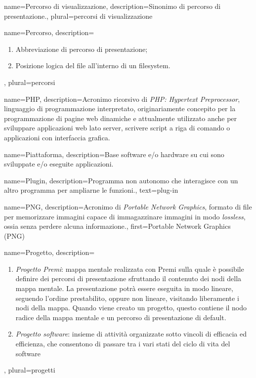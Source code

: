 {
name={Percorso di visualizzazione},
description={Sinonimo di percorso di presentazione.},
plural={percorsi di visualizzazione}
}

{
name={Percorso},
description={\begin{enumerate}
\item Abbreviazione di percorso di presentazione;
\item Posizione logica del file all’interno di un filesystem.
\end{enumerate}},
plural={percorsi}
}

{
name={PHP},
description={Acronimo ricorsivo di \textit{PHP: Hypertext Preprocessor}, linguaggio di programmazione interpretato, originariamente concepito per la programmazione di pagine web dinamiche e attualmente utilizzato anche per sviluppare applicazioni web lato server, scrivere script a riga di comando o applicazioni con interfaccia grafica.}
}

{
name={Piattaforma},
description={Base software e/o hardware su cui sono sviluppate e/o eseguite applicazioni.}
}

{
name={Plugin},
description={Programma non autonomo che interagisce con un altro programma per ampliarne le funzioni.},
text={plug-in}
}

{
name={PNG},
description={Acronimo di \textit{Portable Network Graphics}, formato di file per memorizzare immagini capace di immagazzinare immagini in modo \textit{lossless}, ossia senza perdere alcuna informazione.},
first={Portable Network Graphics (PNG)}
}

{
name={Progetto},
description={\begin{enumerate}
\item \textit{Progetto Premi}: mappa mentale realizzata con Premi sulla quale è possibile definire dei percorsi di presentazione sfruttando il contenuto dei nodi della mappa mentale. La presentazione potrà essere eseguita in modo lineare, seguendo l'ordine prestabilito, oppure non lineare, visitando liberamente i nodi della mappa. Quando viene creato un progetto, questo contiene il nodo radice della mappa mentale e un percorso di presentazione di default.
\item \textit{Progetto software}: insieme di attività organizzate sotto vincoli di efficacia ed efficienza, che consentono di passare tra i vari stati del ciclo di vita del software
\end{enumerate}
},
plural={progetti}
}


